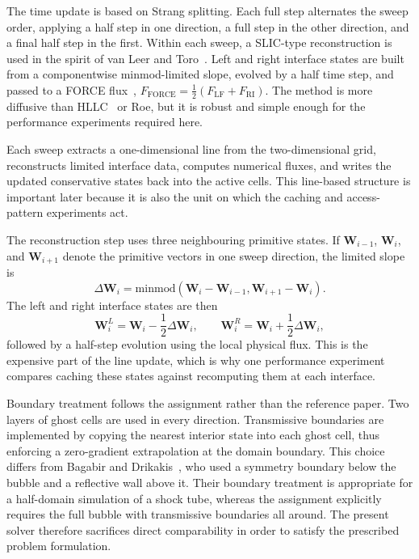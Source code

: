 \documentclass[final,3p,times,twocolumn]{elsarticle}
\begin{document}
The time update is based on Strang splitting. Each full step alternates the sweep order, applying a half step in one direction, a full step in the other direction, and a final half step in the first. Within each sweep, a SLIC-type reconstruction is used in the spirit of van Leer and Toro~\cite{vanleer1979,toro2009}. Left and right interface states are built from a componentwise minmod-limited slope, evolved by a half time step, and passed to a FORCE flux~\cite{toro2009}, \(F_{\mathrm{FORCE}} = \tfrac{1}{2}(F_{\mathrm{LF}} + F_{\mathrm{RI}})\). The method is more diffusive than HLLC~\cite{toro1994} or Roe, but it is robust and simple enough for the performance experiments required here.

Each sweep extracts a one-dimensional line from the two-dimensional grid, reconstructs limited interface data, computes numerical fluxes, and writes the updated conservative states back into the active cells. This line-based structure is important later because it is also the unit on which the caching and access-pattern experiments act.

The reconstruction step uses three neighbouring primitive states. If $\mathbf{W}_{i-1}$, $\mathbf{W}_{i}$, and $\mathbf{W}_{i+1}$ denote the primitive vectors in one sweep direction, the limited slope is
\begin{equation}
\Delta \mathbf{W}_{i} = \mathrm{minmod}\left(\mathbf{W}_{i} - \mathbf{W}_{i-1},
\mathbf{W}_{i+1} - \mathbf{W}_{i}\right).
\end{equation}
The left and right interface states are then
\begin{equation}
\mathbf{W}_{i}^{L} = \mathbf{W}_{i} - \frac{1}{2}\Delta \mathbf{W}_{i}, \qquad
\mathbf{W}_{i}^{R} = \mathbf{W}_{i} + \frac{1}{2}\Delta \mathbf{W}_{i},
\end{equation}
followed by a half-step evolution using the local physical flux. This is the expensive part of the line update, which is why one performance experiment compares caching these states against recomputing them at each interface.

Boundary treatment follows the assignment rather than the reference paper. Two layers of ghost cells are used in every direction. Transmissive boundaries are implemented by copying the nearest interior state into each ghost cell, thus enforcing a zero-gradient extrapolation at the domain boundary. This choice differs from Bagabir and Drikakis~\cite{bagabir2001}, who used a symmetry boundary below the bubble and a reflective wall above it. Their boundary treatment is appropriate for a half-domain simulation of a shock tube, whereas the assignment explicitly requires the full bubble with transmissive boundaries all around. The present solver therefore sacrifices direct comparability in order to satisfy the prescribed problem formulation.
\end{document}
